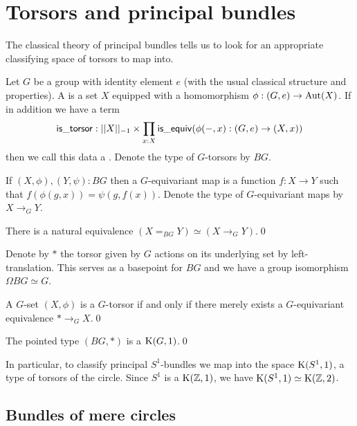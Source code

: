\section{Torsors and principal bundles}

The classical theory of principal bundles tells us to look for an appropriate classifying space of torsors to map into.

\begin{mydef}
Let \( G \) be a group with identity element \( e \) (with the usual classical structure and properties). A  is a set \( X \) equipped with a homomorphism \( \phi:(G,e)\to\operatorname{Aut}(X) \). If in addition we have a term
\[ 
\mathsf{is\_torsor}:||X||_{-1}\times \prod_{x:X}\mathsf{is\_equiv}(\phi(-,x):(G,e)\to (X,x))
\] then we call this data a . Denote the type of \( G \)-torsors by \( BG \).
\end{mydef}

If \( (X,\phi),(Y,\psi):BG \) then a \( G \)-equivariant map is a function \( f:X\to Y \) such that \( f(\phi(g,x))=\psi(g,f(x)) \). Denote the type of \( G \)-equivariant maps by \( X\to_G Y \).

\begin{mylemma}
There is a natural equivalence \( (X=_{BG}Y) \simeq (X\to_G Y) \).\qed
\end{mylemma}

Denote by \( * \) the torsor given by \( G \) actions on its underlying set by left-translation. This serves as a basepoint for \( BG \) and we have a group isomorphism \( \Omega BG\simeq G \).

\begin{mylemma}
A \( G \)-set \( (X,\phi) \) is a \( G \)-torsor if and only if there merely exists a \( G \)-equivariant equivalence \( *\to_G X \).\qed
\end{mylemma}

\begin{mycor}
The pointed type \( (BG,*) \) is a \( \mathrm{K}(G,1) \).\qed
\end{mycor}

In particular, to classify principal \( S^1 \)-bundles we map into the space \( \mathrm{K}(S^1, 1) \), a type of torsors of the circle. Since \( S^1 \) is a \( \mathrm{K}(\mathbb{Z},1) \), we have \( \mathrm{K}(S^1,1)\simeq\mathrm{K}(\mathbb{Z},2) \).

\subsection{Bundles of mere circles}

